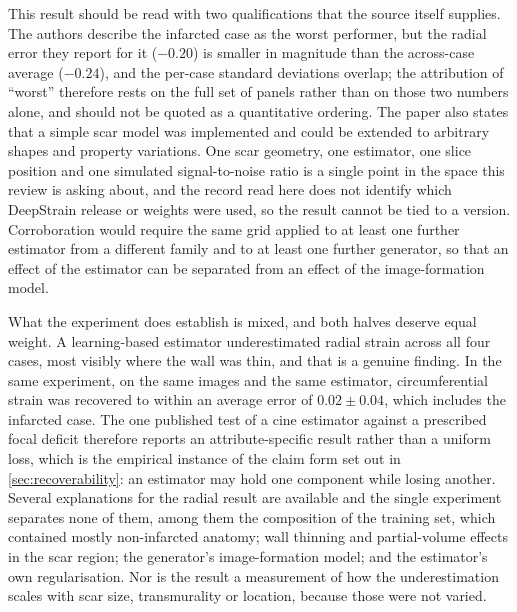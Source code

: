 This result should be read with two qualifications that the source itself supplies. The authors
describe the infarcted case as the worst performer, but the radial error they report for it
($-0.20$) is smaller in magnitude than the across-case average ($-0.24$), and the per-case standard
deviations overlap; the attribution of \enquote{worst} therefore rests on the full set of panels
rather than on those two numbers alone, and should not be quoted as a quantitative ordering. The
paper also states that a simple scar model was implemented and could be extended to arbitrary shapes
and property variations. One scar geometry, one estimator, one slice position and one simulated
signal-to-noise ratio is a single point in the space this review is asking about, and the record read
here does not identify which DeepStrain release or weights were used, so the result cannot be tied to
a version. Corroboration would require the same grid applied to at least one further estimator from a
different family and to at least one further generator, so that an effect of the estimator can be
separated from an effect of the image-formation model.

What the experiment does establish is mixed, and both halves deserve equal weight. A learning-based
estimator underestimated radial strain across all four cases, most visibly where the wall was thin,
and that is a genuine finding. In the same experiment, on the same images and the same estimator,
circumferential strain was recovered to within an average error of $0.02\pm0.04$, which includes the
infarcted case. The one published test of a cine estimator against a prescribed focal deficit
therefore reports an attribute-specific result rather than a uniform loss, which is the empirical
instance of the claim form set out in \cref{sec:recoverability}: an estimator may hold one component
while losing another. Several explanations for the radial result are available and the single
experiment separates none of them, among them the composition of the training set, which contained
mostly non-infarcted anatomy; wall thinning and partial-volume effects in the scar region; the
generator's image-formation model; and the estimator's own regularisation. Nor is the result a
measurement of how the underestimation scales with scar size, transmurality or location, because
those were not varied.

